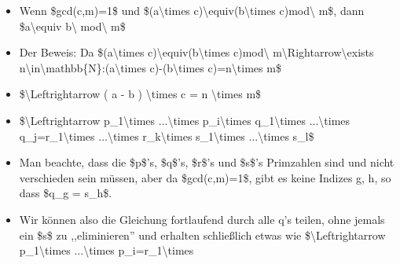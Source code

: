 \documentclass[a4paper]{article}
\begin{document}
\begin{multicols}{3}
\begin{itemize}
\begin{itemize}
                        \begin{itemize}
                            \item
                                  Wenn \$gcd(c,m)=1\$ und \$(a\textbackslash times
                                  c)\textbackslash equiv(b\textbackslash times c)mod\textbackslash{}
                                  m\$, dann \$a\textbackslash equiv b\textbackslash{}
                                  mod\textbackslash{} m\$
                            \item
                                  Der Beweis: Da \$(a\textbackslash times
                                  c)\textbackslash equiv(b\textbackslash times c)mod\textbackslash{}
                                  m\textbackslash Rightarrow\textbackslash exists
                                  n\textbackslash in\textbackslash mathbb\{N\}:(a\textbackslash times
                                  c)-(b\textbackslash times c)=n\textbackslash times m\$
                            \item
                                  \$\textbackslash Leftrightarrow ( a - b ) \textbackslash times c =
                                  n \textbackslash times m\$
                            \item
                                  \$\textbackslash Leftrightarrow p\_1\textbackslash times
                                  ...\textbackslash times p\_i\textbackslash times
                                  q\_1\textbackslash times ...\textbackslash times
                                  q\_j=r\_1\textbackslash times ...\textbackslash times
                                  r\_k\textbackslash times s\_1\textbackslash times
                                  ...\textbackslash times s\_l\$
                            \item
                                  Man beachte, dass die \$p\$'s, \$q\$'s, \$r\$'s und \$s\$'s
                                  Primzahlen sind und nicht verschieden sein müssen, aber da
                                  \$gcd(c,m)=1\$, gibt es keine Indizes g, h, so dass \$q\_g =
                                  s\_h\$.
                            \item
                                  Wir können also die Gleichung fortlaufend durch alle q's teilen,
                                  ohne jemals ein \$s\$ zu ,,eliminieren'' und erhalten schließlich
                                  etwas wie \$\textbackslash Leftrightarrow p\_1\textbackslash times
                                  ...\textbackslash times p\_i=r\_1\textbackslash times

\end{itemize}
\end{itemize}
\end{itemize}
\end{multicols}
\end{document}
